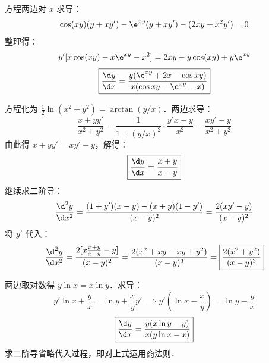 \begin{solution}
    方程两边对 $x$ 求导：
    \begin{equation}
        \cos(xy)(y + x y') - \e^{xy}(y + x y') - (2xy + x^2 y') = 0
    \end{equation}
    整理得：
    \begin{equation}
        y' [x \cos(xy) - x \e^{xy} - x^2] = 2xy - y \cos(xy) + y \e^{xy}
    \end{equation}
    \begin{equation}
        \boxed{\frac{\d y}{\d x} = \frac{y(\e^{xy} + 2x - \cos xy)}{x(\cos xy - \e^{xy} - x)}}
    \end{equation}

    方程化为 $\frac{1}{2} \ln(x^2 + y^2) = \arctan(y/x)$．两边求导：
    \begin{equation}
        \frac{x + y y'}{x^2 + y^2} = \frac{1}{1 + (y/x)^2} \cdot \frac{y' x - y}{x^2} = \frac{x y' - y}{x^2 + y^2}
    \end{equation}
    由此得 $x + y y' = x y' - y$，解得：
    \begin{equation}
        \boxed{\frac{\d y}{\d x} = \frac{x + y}{x - y}}
    \end{equation}
    继续求二阶导：
    \begin{equation}
        \frac{\d^2 y}{\d x^2} = \frac{(1 + y')(x - y) - (x + y)(1 - y')}{(x - y)^2} = \frac{2(x y' - y)}{(x - y)^2}
    \end{equation}
    将 $y'$ 代入：
    \begin{equation}
        \frac{\d^2 y}{\d x^2} = \frac{2 [x \frac{x+y}{x-y} - y]}{(x - y)^2} = \frac{2(x^2 + xy - xy + y^2)}{(x - y)^3} = \boxed{\frac{2(x^2 + y^2)}{(x - y)^3}}
    \end{equation}

    两边取对数得 $y \ln x = x \ln y$．求导：
    \begin{equation}
        y' \ln x + \frac{y}{x} = \ln y + \frac{x}{y} y' \implies y' \left(\ln x - \frac{x}{y}\right) = \ln y - \frac{y}{x}
    \end{equation}
    \begin{equation}
        \boxed{\frac{\d y}{\d x} = \frac{y(x \ln y - y)}{x(y \ln x - x)}}
    \end{equation}
    求二阶导省略代入过程，即对上式运用商法则．


\end{solution}
